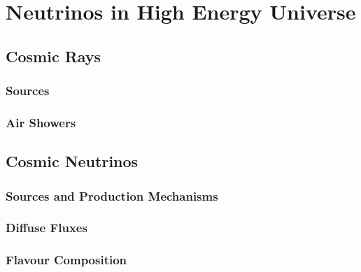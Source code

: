 \setchapterpreamble[u]{\margintoc}
\chapter{Neutrinos in High Energy Universe}




\section{Cosmic Rays}

\label{sec:cosmic_rays}

\subsection{Sources}

\subsection{Air Showers}
\label{sec:atm_nu}

\section{Cosmic Neutrinos}
\label{sec:cosmic_nu}

\subsection{Sources and Production Mechanisms}

\subsection{Diffuse Fluxes}

\subsection{Flavour Composition}
\label{sec:flavor_theory}